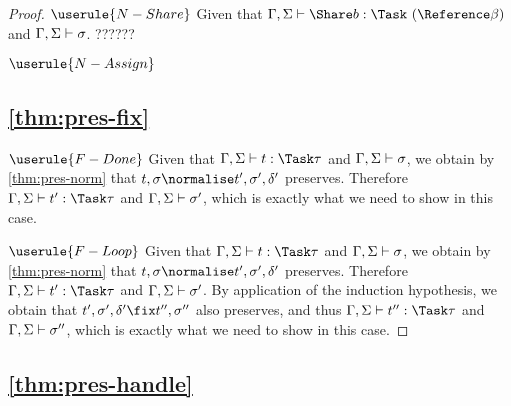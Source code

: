 \begin{proof}
\case
  {$\userule{N-Share}$}
  {Given that $\Gamma,\Sigma\infers \Share b:\Task\ (\Reference \beta)$ and $\Gamma,\Sigma\vdash\sigma$.
  ?????? 
  }

\case
  {$\userule{N-Assign}$}
  {}


\subsection{\cref{thm:pres-fix}}

\case
  {$\userule{F-Done}$}
  {Given that $\Gamma,\Sigma\infers t :\Task\tau$ and $\Gamma,\Sigma\vdash \sigma$, we obtain by \cref{thm:pres-norm} that $t,\sigma\normalise t',\sigma',\delta'$ preserves. Therefore $\Gamma,\Sigma\infers t':\Task\tau$ and $\Gamma,\Sigma\vdash\sigma'$, which is exactly what we need to show in this case.}

\case
  {$\userule{F-Loop}$}
  {Given that $\Gamma,\Sigma\infers t :\Task\tau$ and $\Gamma,\Sigma\vdash \sigma$, we obtain by \cref{thm:pres-norm} that $t,\sigma\normalise t',\sigma',\delta'$ preserves. Therefore $\Gamma,\Sigma\infers t':\Task\tau$ and $\Gamma,\Sigma\vdash\sigma'$.
  By application of the induction hypothesis, we obtain that $t',\sigma',\delta'\fix t'',\sigma''$ also preserves, and thus $\Gamma,\Sigma\infers t'':\Task\tau$ and $\Gamma,\Sigma\vdash\sigma''$, which is exactly what we need to show in this case.}
\end{proof}

\subsection{\cref{thm:pres-handle}}

